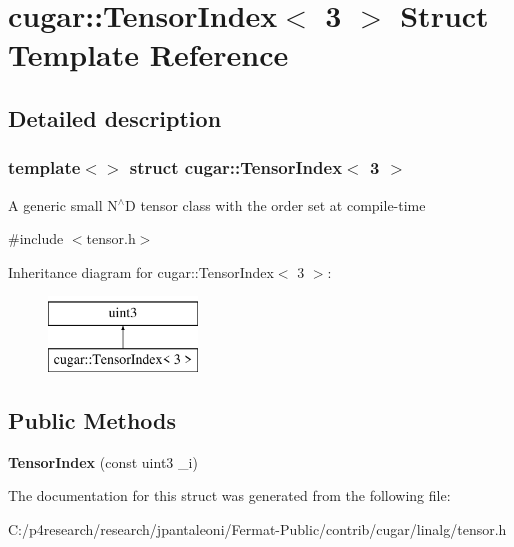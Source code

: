 \hypertarget{structcugar_1_1_tensor_index_3_013_01_4}{}\section{cugar\+:\+:Tensor\+Index$<$ 3 $>$ Struct Template Reference}
\label{structcugar_1_1_tensor_index_3_013_01_4}


\subsection{Detailed description}
\subsubsection*{template$<$$>$\newline
struct cugar\+::\+Tensor\+Index$<$ 3 $>$}

A generic small N$^\wedge$D tensor class with the order set at compile-\/time 

{\ttfamily \#include $<$tensor.\+h$>$}

Inheritance diagram for cugar\+:\+:Tensor\+Index$<$ 3 $>$\+:\begin{figure}[H]
\begin{center}
\leavevmode
\includegraphics[height=2.000000cm]{structcugar_1_1_tensor_index_3_013_01_4}
\end{center}
\end{figure}
\subsection*{Public Methods}
\begin{DoxyCompactItemize}
\item 
\mbox{\label{structcugar_1_1_tensor_index_3_013_01_4_aeb302fff56e888f02064ed9e509f70bb}} 
{\bfseries Tensor\+Index} (const uint3 \+\_\+i)
\end{DoxyCompactItemize}


The documentation for this struct was generated from the following file\+:\begin{DoxyCompactItemize}
\item 
C\+:/p4research/research/jpantaleoni/\+Fermat-\/\+Public/contrib/cugar/linalg/tensor.\+h\end{DoxyCompactItemize}
